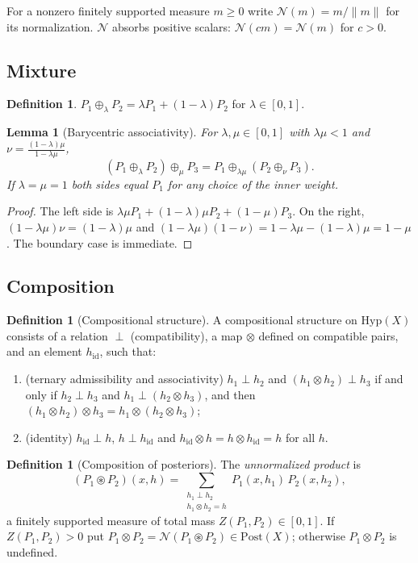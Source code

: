 \documentclass[11pt]{article}
\newtheorem{lemma}[theorem]{Lemma}
\theoremstyle{definition}
\newtheorem{definition}[theorem]{Definition}
\theoremstyle{remark}
\newcommand{\Hyp}{\mathrm{Hyp}}
\newcommand{\Post}{\mathrm{Post}}
\newcommand{\hid}{h_{\mathrm{id}}}
\newcommand{\N}{\mathcal{N}}
\newcommand{\cp}{\circledast}
\begin{document}
For a nonzero finitely supported measure $m\ge 0$ write $\N(m)=m/\lVert m\rVert$ for its
normalization. $\N$ absorbs positive scalars: $\N(cm)=\N(m)$ for $c>0$.

\subsection{Mixture}

\begin{definition}
$P_1\oplus_\lambda P_2=\lambda P_1+(1-\lambda)P_2$ for $\lambda\in[0,1]$.
\end{definition}

\begin{lemma}[Barycentric associativity]\label{lem:baryassoc}
For $\lambda,\mu\in[0,1]$ with $\lambda\mu<1$ and $\nu=\frac{(1-\lambda)\mu}{1-\lambda\mu}$,
\[
(P_1\oplus_\lambda P_2)\oplus_\mu P_3 = P_1\oplus_{\lambda\mu}(P_2\oplus_\nu P_3).
\]
If $\lambda=\mu=1$ both sides equal $P_1$ for any choice of the inner weight.
\end{lemma}
\begin{proof}
The left side is $\lambda\mu P_1+(1-\lambda)\mu P_2+(1-\mu)P_3$. On the right,
$(1-\lambda\mu)\nu=(1-\lambda)\mu$ and $(1-\lambda\mu)(1-\nu)=1-\lambda\mu-(1-\lambda)\mu=1-\mu$. The
boundary case is immediate.
\end{proof}

\subsection{Composition}

\begin{definition}[Compositional structure]\label{def:comp}
A compositional structure on $\Hyp(X)$ consists of a relation $\perp$ (compatibility), a map
$\otimes$ defined on compatible pairs, and an element $\hid$, such that:
\begin{enumerate}[label=(A\arabic*)]
\item (ternary admissibility and associativity) $h_1\perp h_2$ and $(h_1\otimes h_2)\perp h_3$ if and
  only if $h_2\perp h_3$ and $h_1\perp(h_2\otimes h_3)$, and then
  $(h_1\otimes h_2)\otimes h_3=h_1\otimes(h_2\otimes h_3)$;
\item (identity) $\hid\perp h$, $h\perp\hid$ and $\hid\otimes h=h\otimes\hid=h$ for all $h$.
\end{enumerate}
\end{definition}

\begin{definition}[Composition of posteriors]
The \emph{unnormalized product} is
\[
(P_1\cp P_2)(x,h)=\sum_{\substack{h_1\perp h_2\\ h_1\otimes h_2=h}}P_1(x,h_1)\,P_2(x,h_2),
\]
a finitely supported measure of total mass $Z(P_1,P_2)\in[0,1]$. If $Z(P_1,P_2)>0$ put
$P_1\otimes P_2=\N(P_1\cp P_2)\in\Post(X)$; otherwise $P_1\otimes P_2$ is undefined.
\end{definition}
\end{document}

